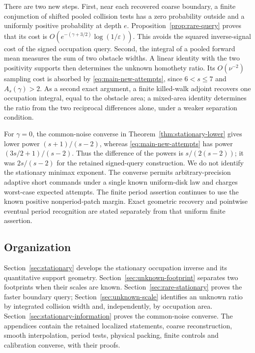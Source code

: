 There are two new steps. First, near each recovered coarse boundary,
a finite conjunction of shifted pooled collision tests has a zero
probability outside and a uniformly positive probability at depth $e$.
Proposition~\ref{prop:rare-query} proves that its cost is
$O(e^{-(\gamma+3/2)}\log(1/\varepsilon))$. This avoids the squared
inverse-signal cost of the signed occupation query. Second, the integral of a pooled forward mean measures the sum of two
obstacle widths. A linear identity with the two positivity supports
then determines the unknown homothety ratio. Its $O(\nu^{-2})$
sampling cost is absorbed
by \eqref{eq:main-new-attempts}, since $6<s\le7$ and
$A_s(\gamma)>2$. As a second exact argument, a finite killed-walk
adjoint recovers one occupation integral, equal to the obstacle area;
a mixed-area identity determines the ratio from the two reciprocal
differences alone, under a weaker separation condition.

For $\gamma=0$, the common-noise converse in
Theorem~\ref{thm:stationary-lower} gives lower power $(s+1)/(s-2)$,
whereas \eqref{eq:main-new-attempts} has power $(3s/2+1)/(s-2)$.
Thus the difference of the powers is $s/(2(s-2))$; it was $2s/(s-2)$
for the retained signed-query construction. We do not identify the
stationary minimax exponent. The converse permits arbitrary-precision
adaptive short commands under a single known uniform-disk law and
charges worst-case expected attempts. The finite period assertion
continues to use the known positive nonperiod-patch margin. Exact
geometric recovery and pointwise eventual period recognition are
stated separately from that uniform finite assertion.

\subsection{Organization}
Section~\ref{sec:stationary} develops the stationary occupation inverse
and its quantitative support geometry. Section~\ref{sec:unknown-footprint}
separates two footprints when their scales are known.
Section~\ref{sec:rare-stationary} proves the faster boundary query;
Section~\ref{sec:unknown-scale} identifies an unknown ratio by integrated
collision width and, independently, by occupation area.
Section~\ref{sec:stationary-information} proves the common-noise
converse. The appendices contain the retained localized statements,
coarse reconstruction, smooth interpolation, period tests, physical
packing, finite controls and calibration converse, with their proofs.
